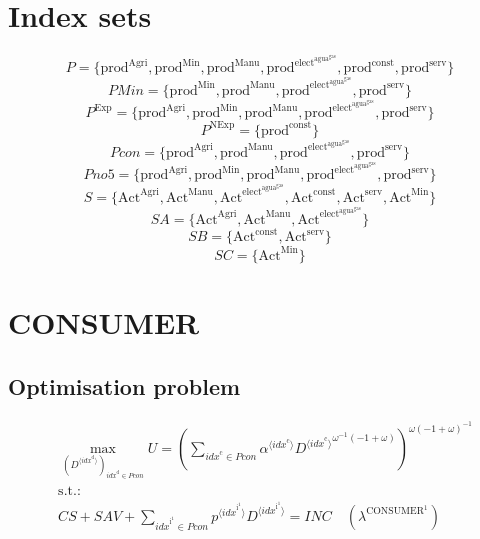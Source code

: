 

\section*{Index sets}

$$P = \{ \mathrm{prod}^{\mathrm{Agri}}, \mathrm{prod}^{\mathrm{Min}}, \mathrm{prod}^{\mathrm{Manu}}, \mathrm{prod}^{\mathrm{elect}^{\mathrm{agua}^{\mathrm{gas}}}}, \mathrm{prod}^{\mathrm{const}}, \mathrm{prod}^{\mathrm{serv}} \}$$
$${P\!M\!i\!n} = \{ \mathrm{prod}^{\mathrm{Min}}, \mathrm{prod}^{\mathrm{Manu}}, \mathrm{prod}^{\mathrm{elect}^{\mathrm{agua}^{\mathrm{gas}}}}, \mathrm{prod}^{\mathrm{serv}} \}$$
$$P^{\mathrm{Exp}} = \{ \mathrm{prod}^{\mathrm{Agri}}, \mathrm{prod}^{\mathrm{Min}}, \mathrm{prod}^{\mathrm{Manu}}, \mathrm{prod}^{\mathrm{elect}^{\mathrm{agua}^{\mathrm{gas}}}}, \mathrm{prod}^{\mathrm{serv}} \}$$
$$P^{\mathrm{NExp}} = \{ \mathrm{prod}^{\mathrm{const}} \}$$
$${P\!c\!o\!n} = \{ \mathrm{prod}^{\mathrm{Agri}}, \mathrm{prod}^{\mathrm{Manu}}, \mathrm{prod}^{\mathrm{elect}^{\mathrm{agua}^{\mathrm{gas}}}}, \mathrm{prod}^{\mathrm{serv}} \}$$
$${P\!n\!o\!5} = \{ \mathrm{prod}^{\mathrm{Agri}}, \mathrm{prod}^{\mathrm{Min}}, \mathrm{prod}^{\mathrm{Manu}}, \mathrm{prod}^{\mathrm{elect}^{\mathrm{agua}^{\mathrm{gas}}}}, \mathrm{prod}^{\mathrm{serv}} \}$$
$$S = \{ \mathrm{Act}^{\mathrm{Agri}}, \mathrm{Act}^{\mathrm{Manu}}, \mathrm{Act}^{\mathrm{elect}^{\mathrm{agua}^{\mathrm{gas}}}}, \mathrm{Act}^{\mathrm{const}}, \mathrm{Act}^{\mathrm{serv}}, \mathrm{Act}^{\mathrm{Min}} \}$$
$${S\!A} = \{ \mathrm{Act}^{\mathrm{Agri}}, \mathrm{Act}^{\mathrm{Manu}}, \mathrm{Act}^{\mathrm{elect}^{\mathrm{agua}^{\mathrm{gas}}}} \}$$
$${S\!B} = \{ \mathrm{Act}^{\mathrm{const}}, \mathrm{Act}^{\mathrm{serv}} \}$$
$${S\!C} = \{ \mathrm{Act}^{\mathrm{Min}} \}$$

\section{CONSUMER}

\subsection{Optimisation problem}

\begin{align}
&\max_{\left({D}^{\langle {i\!d\!x}^{\mathrm{d}}\rangle}\right)_{{i\!d\!x}^{\mathrm{d}}\in {P\!c\!o\!n}}
} U = \left(\sum_{{i\!d\!x}^{\mathrm{c}}\in {P\!c\!o\!n}} {{\alpha}^{\langle {i\!d\!x}^{\mathrm{c}}\rangle}} {{{D}^{\langle {i\!d\!x}^{\mathrm{c}}\rangle}}^{{\omega}^{-1} \left(-1 + \omega\right)}}\right)^{{\omega} \left(-1 + \omega\right)^{-1}}\\
&\mathrm{s.t.:}\nonumber\\
& {C\!S} + {S\!A\!V} + \sum_{{i\!d\!x}^{\mathrm{i}^{\mathrm{1}}}\in {P\!c\!o\!n}} {{p}^{\langle {i\!d\!x}^{\mathrm{i}^{\mathrm{1}}}\rangle}} {{D}^{\langle {i\!d\!x}^{\mathrm{i}^{\mathrm{1}}}\rangle}} = {I\!N\!C} \quad \left(\lambda^{\mathrm{CONSUMER}^{\mathrm{1}}}\right)
\end{align}


